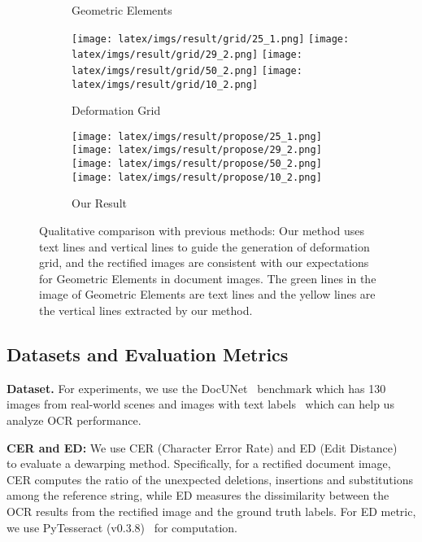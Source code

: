 \documentclass[10pt,twocolumn,letterpaper]{article}
\newcommand{\myparagraph}[1]{\vspace{1pt} \noindent \textbf{#1} }
\begin{document}
\begin{figure*}[!t]
\begin{subfigure}[b]{1.0\linewidth}
\begin{minipage}[b]{0.16\linewidth}
        \caption{Geometric Elements}
    \end{minipage}  
    \begin{minipage}[b]{0.16\linewidth}
        \centering
        \texttt{[image: latex/imgs/result/grid/25\_1.png]}
        \texttt{[image: latex/imgs/result/grid/29\_2.png]}
        \texttt{[image: latex/imgs/result/grid/50\_2.png]}
        \texttt{[image: latex/imgs/result/grid/10\_2.png]}
        \caption{Deformation Grid}
    \end{minipage} 
    \begin{minipage}[b]{0.16\linewidth}
        \centering
        \texttt{[image: latex/imgs/result/propose/25\_1.png]}
        \texttt{[image: latex/imgs/result/propose/29\_2.png]}
        \texttt{[image: latex/imgs/result/propose/50\_2.png]} 
        \texttt{[image: latex/imgs/result/propose/10\_2.png]}    
        \caption{Our Result}
    \end{minipage} 
  
\end{subfigure}
\caption{Qualitative comparison with previous methods: Our method uses text lines and vertical lines to guide the generation of deformation grid, and the rectified images are consistent with our expectations for Geometric Elements in document images. The green lines in the image of Geometric Elements are text lines and the yellow lines are the vertical lines extracted by our method.}
\vspace{-3mm}
\label{fig:result}

\end{figure*}





\subsection{Datasets and Evaluation Metrics}


\myparagraph{Dataset.} For experiments, we use the DocUNet~\cite{Ma_2018_CVPR} benchmark which has 130 images from real-world scenes and  images with text labels~\cite{textlabels} which can help us analyze OCR performance.

\myparagraph{CER and ED:} We use CER (Character Error Rate) and ED (Edit Distance)~\cite{levenshtein1966binary} to evaluate a dewarping method. Specifically, for a rectified document image, CER computes the ratio of the unexpected deletions, insertions and substitutions among the reference string, while ED measures the dissimilarity between the OCR results from the rectified image and the ground truth labels.  For ED metric, we use PyTesseract (v0.3.8)~\cite{smith2007overview} for computation.
\end{document}
